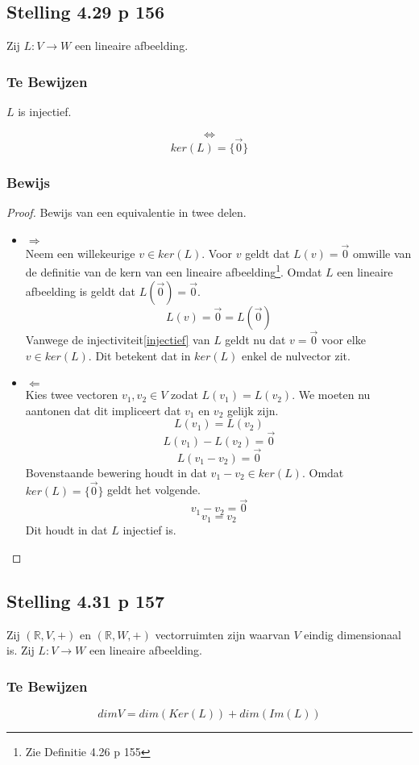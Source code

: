 \documentclass[lineaire_algebra_oplossingen.tex]{subfiles}
\begin{document}
\subsection{Stelling 4.29 p 156}
Zij $L:V\rightarrow W$ een lineaire afbeelding.
\subsubsection*{Te Bewijzen}
\begin{center}
$L$ is injectief.
\end{center}
\[\Leftrightarrow\]
\[
ker(L) = \{\vec{0}\}
\]
\subsubsection*{Bewijs}
\begin{proof}
Bewijs van een equivalentie in twee delen.
\begin{itemize}
\item $\Rightarrow$\\
Neem een willekeurige $v\in ker(L)$. Voor $v$ geldt dat $L(v) = \vec{0}$ omwille van de definitie van de kern van een lineaire afbeelding\footnote{Zie Definitie 4.26 p 155}. Omdat $L$ een lineaire afbeelding is geldt dat $L(\vec{0}) = \vec{0}$.
\[
L(v) = \vec{0} = L(\vec{0})
\]
Vanwege de injectiviteit\ref{injectief} van $L$ geldt nu dat $v=\vec{0}$ voor elke $v \in ker(L)$. Dit betekent dat in $ker(L)$ enkel de nulvector zit.
\item $\Leftarrow$\\
Kies twee vectoren $v_1,v_2 \in V$ zodat $L(v_1)=L(v_2)$. We moeten nu aantonen dat dit impliceert dat $v_1$ en $v_2$ gelijk zijn.
\[
L(v_1)=L(v_2)
\]
\[
L(v_1)-L(v_2) = \vec{0}
\]
\[
L(v_1-v_2) = \vec{0}
\]
Bovenstaande bewering houdt in dat $v_1-v_2 \in ker(L)$. Omdat $ker(L) = \{\vec{0}\}$ geldt het volgende.
\[
v_1-v_2 = \vec{0}
\]
\[
v_1=v_2
\]
Dit houdt in dat $L$ injectief is.
\end{itemize}
\end{proof}

\subsection{Stelling 4.31 p 157}
Zij $(\mathbb{R},V,+)$ en $(\mathbb{R},W,+)$ vectorruimten zijn waarvan $V$ eindig dimensionaal is. Zij $L:V\rightarrow W$ een lineaire afbeelding.
\subsubsection*{Te Bewijzen}
\[
dimV = dim(Ker(L)) + dim(Im(L))
\]
\end{document}
